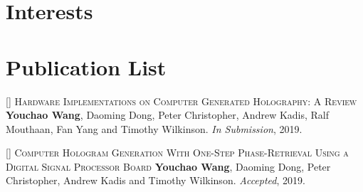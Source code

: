 \documentclass[11pt,a4paper]{moderncv}
\begin{document}
\vspace*{-0.2cm}

\vspace*{-0.2cm}

\vspace*{-0.8cm}

\section{Interests}
\vspace*{-0.2cm}

\vspace*{-0.4cm}

\section{Publication List}
\setcounter{counter}{1}

\textsc{[] Hardware Implementations on Computer Generated Holography: A Review}
\newline  \textbf{Youchao Wang}, Daoming Dong, Peter Christopher, Andrew Kadis, Ralf Mouthaan, Fan Yang and Timothy Wilkinson. \textit{In Submission}, 2019.


\addtocounter{counter}{1}

\textsc{[] Computer Hologram Generation With One-Step Phase-Retrieval Using a Digital Signal Processor Board}
\newline  \textbf{Youchao Wang}, Daoming Dong, Peter Christopher, Andrew Kadis and Timothy Wilkinson. \textit{Accepted}, 2019.
\end{document}

